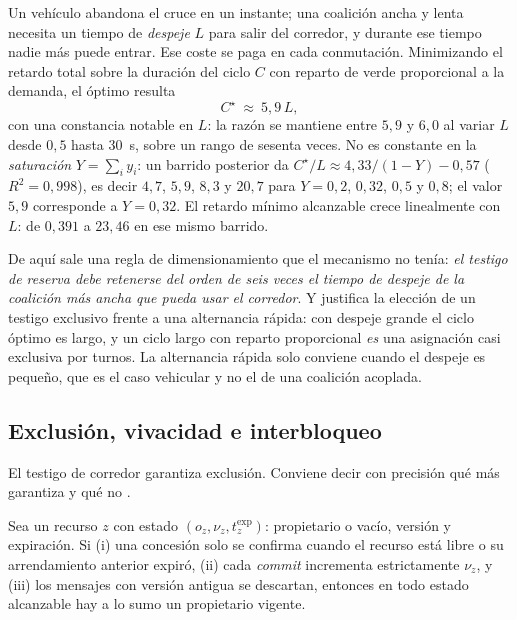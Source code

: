 \begin{observacion}
\label{obs:ciclo-despeje}
Un vehículo abandona el cruce en un instante; una coalición ancha y lenta
necesita un tiempo de \emph{despeje} $L$ para salir del corredor, y durante ese
tiempo nadie más puede entrar. Ese coste se paga en cada conmutación. Minimizando
el retardo total sobre la duración del ciclo $C$ con reparto de verde
proporcional a la demanda, el óptimo resulta
\[
  C^\star\ \approx\ 5{,}9\,L,
\]
con una constancia notable en $L$: la razón se mantiene entre $5{,}9$ y $6{,}0$ al
variar $L$ desde $0{,}5$ hasta $30$~s, sobre un rango de sesenta veces. No es
constante en la \emph{saturación} $Y=\sum_i y_i$: un barrido posterior da
$C^\star/L\approx4{,}33/(1-Y)-0{,}57$ ($R^2=0{,}998$), es decir $4{,}7$, $5{,}9$,
$8{,}3$ y $20{,}7$ para $Y=0{,}2$, $0{,}32$, $0{,}5$ y $0{,}8$; el valor $5{,}9$
corresponde a $Y=0{,}32$. El
retardo mínimo alcanzable crece linealmente con $L$: de $0{,}391$ a $23{,}46$ en
ese mismo barrido.

De aquí sale una regla de dimensionamiento que el mecanismo no tenía: \emph{el
testigo de reserva debe retenerse del orden de seis veces el tiempo de despeje de
la coalición más ancha que pueda usar el corredor}. Y justifica la elección de
un testigo exclusivo frente a una alternancia rápida: con despeje grande el ciclo
óptimo es largo, y un ciclo largo con reparto proporcional \emph{es} una
asignación casi exclusiva por turnos. La alternancia rápida solo conviene cuando
el despeje es pequeño, que es el caso vehicular y no el de una coalición
acoplada.
\end{observacion}

\subsection{Exclusión, vivacidad e interbloqueo}

El testigo de corredor garantiza exclusión. Conviene decir con precisión qué
más garantiza y qué no \cite{mayorga2026compendio}.

\begin{proposicion}
\label{pr:arrendamiento}
Sea un recurso $z$ con estado $(o_z,\nu_z,t_z^{\exp})$: propietario o vacío,
versión y expiración. Si (i) una concesión solo se confirma cuando el recurso
está libre o su arrendamiento anterior expiró, (ii) cada \emph{commit}
incrementa estrictamente $\nu_z$, y (iii) los mensajes con versión antigua se
descartan, entonces en todo estado alcanzable hay a lo sumo un propietario
vigente.
\end{proposicion}

